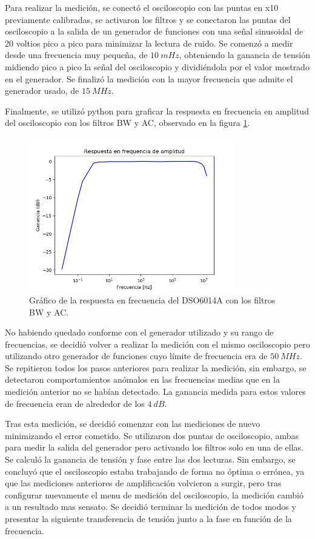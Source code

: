\documentclass[a4paper]{article}
\begin{document}
Para realizar la medición, se conectó el osciloscopio con las puntas en x10 previamente calibradas, se activaron los filtros y se conectaron las puntas del osciloscopio a la salida de un generador de funciones con una señal sinusoidal de 20 voltios pico a pico para minimizar la lectura de ruido. Se comenzó a medir desde una frecuencia muy pequeña, de $10 \ mHz$, obteniendo la ganancia de tensión midiendo pico a pico la señal del osciloscopio y dividiéndola por el valor mostrado en el generador. Se finalizó la medición con la mayor frecuencia que admite el generador usado, de $15 \ MHz$.

Finalmente, se utilizó python para graficar la respuesta en frecuencia en amplitud del osciloscopio con los filtros BW y AC, observado en la figura \ref{graf:resp_freq_osci}.

\begin{figure}[H]
	\centering
	\includegraphics[width=0.8\textwidth]{resp_freq_osci.png}
	\caption{Gráfico de la respuesta en frecuencia del DSO6014A con los filtros BW y AC.} 
	\label{graf:resp_freq_osci}
\end{figure}

No habiendo quedado conforme con el generador utilizado y su rango de frecuencias, se decidió volver a realizar la medición con el mismo osciloscopio pero utilizando otro generador de funciones cuyo límite de frecuencia era de $50 \ MHz$. Se repitieron todos los pasos anteriores para realizar la medición, sin embargo, se detectaron comportamientos anómalos en las frecuencias medias que en la medición anterior no se habían detectado. La ganancia medida para estos valores de frecuencia eran de alrededor de los $4 \ dB$.

Tras esta medición, se decidió comenzar con las mediciones de nuevo minimizando el error cometido. Se utilizaron dos puntas de osciloscopio, ambas para medir la salida del generador pero activando los filtros solo en una de ellas. Se calculó la ganancia de tensión y fase entre las dos lecturas. Sin embargo, se concluyó que el osciloscopio estaba trabajando de forma no óptima o errónea, ya que las mediciones anteriores de amplificación volvieron a surgir, pero tras configurar nuevamente el menu de medición del osciloscopio, la medición cambió a un resultado mas sensato. Se decidió terminar la medición de todos modos y presentar la siguiente transferencia de tensión junto a la fase en función de la frecuencia.
\end{document}
